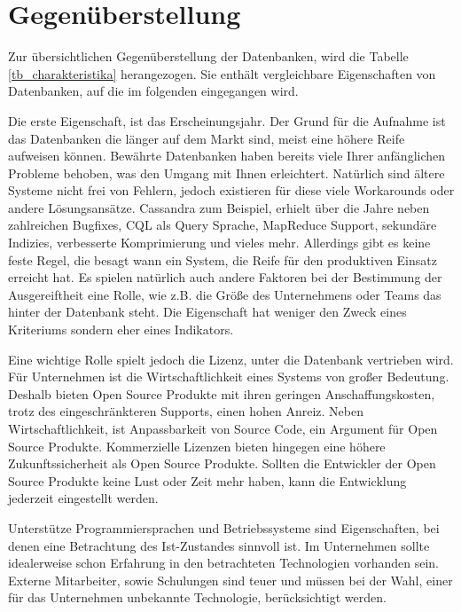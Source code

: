 \section{Gegenüberstellung} 
\label{ch:AnalyseDatenbanken:sec:Gegenüberstellung}

Zur übersichtlichen Gegenüberstellung der Datenbanken, wird die Tabelle \ref{tb_charakteristika} herangezogen. Sie enthält vergleichbare Eigenschaften von Datenbanken, auf die im folgenden eingegangen wird. 

Die erste Eigenschaft, ist das Erscheinungsjahr. Der Grund für die Aufnahme ist das Datenbanken die länger auf dem Markt sind, meist eine höhere Reife aufweisen können. Bewährte Datenbanken haben bereits viele Ihrer anfänglichen Probleme behoben, was den Umgang mit Ihnen erleichtert. Natürlich sind ältere Systeme nicht frei von Fehlern, jedoch existieren für diese viele Workarounds oder andere Lösungsansätze. Cassandra zum Beispiel, erhielt über die Jahre neben zahlreichen Bugfixes, CQL als Query Sprache, MapReduce Support, sekundäre Indizies, verbesserte Komprimierung und vieles mehr. Allerdings gibt es keine feste Regel, die besagt wann ein System, die Reife für den produktiven Einsatz erreicht hat. Es spielen natürlich auch andere Faktoren bei der Bestimmung der Ausgereiftheit eine Rolle, wie z.B. die Größe des Unternehmens oder Teams das hinter der Datenbank steht. Die Eigenschaft hat weniger den Zweck eines Kriteriums sondern eher eines Indikators. 

Eine wichtige Rolle spielt jedoch die Lizenz, unter die Datenbank vertrieben wird. Für Unternehmen ist die Wirtschaftlichkeit eines Systems von großer Bedeutung. Deshalb bieten Open Source Produkte mit ihren geringen Anschaffungskosten, trotz des eingeschränkteren Supports, einen hohen Anreiz. Neben Wirtschaftlichkeit, ist Anpassbarkeit von Source Code, ein Argument für Open Source Produkte. 
Kommerzielle Lizenzen bieten hingegen eine höhere Zukunftssicherheit als Open Source Produkte. Sollten die Entwickler der Open Source Produkte keine Lust oder Zeit mehr haben, kann die Entwicklung jederzeit eingestellt werden. 

Unterstütze Programmiersprachen und Betriebssysteme sind Eigenschaften, bei denen eine Betrachtung des Ist-Zustandes sinnvoll ist. Im Unternehmen sollte idealerweise schon Erfahrung in den betrachteten Technologien vorhanden sein. Externe Mitarbeiter, sowie Schulungen sind teuer und müssen bei der Wahl, einer für das Unternehmen unbekannte Technologie, berücksichtigt werden. 

